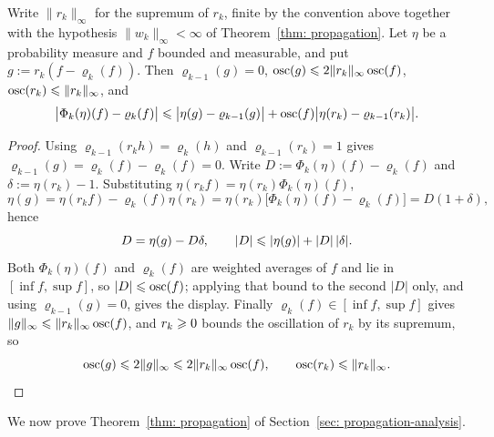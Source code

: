 \documentclass{article}
\begin{document}
\begin{lemma}
\label{lem: appendix-onestep}
Write $\lVert r_k\rVert_\infty$ for the supremum of $r_k$, finite by the convention above together with the hypothesis $\lVert w_k\rVert_\infty<\infty$ of Theorem~\ref{thm: propagation}. Let $\eta$ be a probability measure and $f$ bounded and measurable, and put $g := r_k(f-\varrho_k(f))$. Then $\varrho_{k-1}(g)=0$, $\operatorname{osc}(g)\leqslant 2\lVert r_k\rVert_\infty\operatorname{osc}(f)$, $\operatorname{osc}(r_k)\leqslant\lVert r_k\rVert_\infty$, and
\begin{equation*}
    \bigl|\Phi_k(\eta)(f)-\varrho_k(f)\bigr| \leqslant \bigl|\eta(g)-\varrho_{k-1}(g)\bigr| + \operatorname{osc}(f)\bigl|\eta(r_k)-\varrho_{k-1}(r_k)\bigr|.
\end{equation*}
\end{lemma}

\begin{proof}
Using $\varrho_{k-1}(r_kh)=\varrho_k(h)$ and $\varrho_{k-1}(r_k)=1$ gives $\varrho_{k-1}(g)=\varrho_k(f)-\varrho_k(f)=0$. Write $D:=\Phi_k(\eta)(f)-\varrho_k(f)$ and $\delta:=\eta(r_k)-1$. Substituting $\eta(r_kf)=\eta(r_k)\Phi_k(\eta)(f)$,
\begin{equation*}
    \eta(g) = \eta(r_kf)-\varrho_k(f)\eta(r_k) = \eta(r_k)\bigl[\Phi_k(\eta)(f)-\varrho_k(f)\bigr] = D(1+\delta),
\end{equation*}
hence
\begin{equation*}
    D = \eta(g) - D\delta ,
    \qquad
    |D| \leqslant |\eta(g)| + |D|\,|\delta| .
\end{equation*}
Both $\Phi_k(\eta)(f)$ and $\varrho_k(f)$ are weighted averages of $f$ and lie in $[\inf f,\sup f]$, so $|D|\leqslant\operatorname{osc}(f)$; applying that bound to the second $|D|$ only, and using $\varrho_{k-1}(g)=0$, gives the display. Finally $\varrho_k(f)\in[\inf f,\sup f]$ gives $\lVert g\rVert_\infty\leqslant\lVert r_k\rVert_\infty\operatorname{osc}(f)$, and $r_k\geqslant0$ bounds the oscillation of $r_k$ by its supremum, so
\begin{equation*}
    \operatorname{osc}(g) \leqslant 2\lVert g\rVert_\infty \leqslant 2\lVert r_k\rVert_\infty\operatorname{osc}(f) ,
    \qquad
    \operatorname{osc}(r_k) \leqslant \lVert r_k\rVert_\infty .
\end{equation*}
\end{proof}

We now prove Theorem~\ref{thm: propagation} of Section~\ref{sec: propagation-analysis}.
\end{document}

